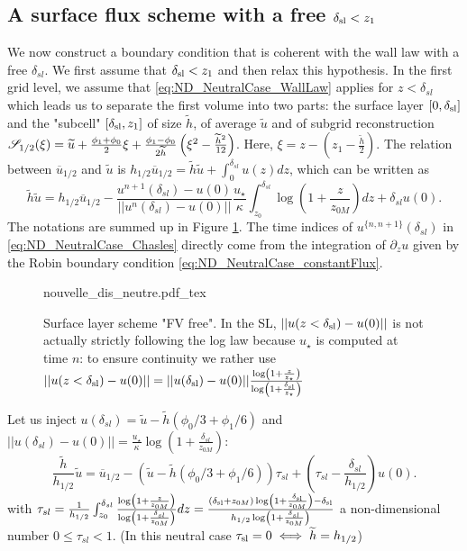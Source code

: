 \subsection{A surface flux scheme with a free $\delta_{\rm sl}<z_1$}
\label{sec:ND_NeutralCase_newSFscheme}
We now construct a boundary condition that is coherent
with the wall law with a free $\delta_{sl}$. We first assume
that $\delta_{\rm sl} < z_1$ and then relax this hypothesis.
In the first grid level, we assume that
\eqref{eq:ND_NeutralCase_WallLaw} applies for $z<\delta_{sl}$
which leads us to separate the 
first volume into two parts: the surface layer $[0,\delta_{\rm sl}]$ and the "subcell" $[\delta_{\rm sl}, z_1]$ of size $\widetilde{h}$, of average $\widetilde{u}$
and of subgrid reconstruction
${\cal S}_{1/2}(\xi) = \widetilde{u} + \frac{\phi_{1} + \phi_{0}}{2} \xi
+ \frac{\phi_{1} - \phi_{0}}{2\widetilde{h}}\left(\xi^2 - \frac{\widetilde{h}^2}{12}\right)
$.
Here, $\xi = z - (z_1 - \frac{\widetilde{h}}{2})$.
The relation between $\overline{u}_{1/2}$ and $\widetilde{u}$ is 
$ h_{1/2}\overline{u}_{1/2} = \widetilde{h}\widetilde{u}
+ \int_0^{\delta_{sl}}u(z)dz$, which can be written as
\begin{equation}
\label{eq:ND_NeutralCase_Chasles}
	\widetilde{h}\widetilde{u} = h_{1/2}\overline{u}_{1/2} - \frac{u^{n+1}(\delta_{sl})-u(0)}{||u^n(\delta_{sl})-u(0)||}\frac{{u_\star}}{\kappa}\int_{z_0}^{\delta_{sl}} \log(1+\frac{z}{z_{0M}}) dz
	+ \delta_{sl} u(0) .
\end{equation}
The notations are summed up in Figure
\ref{fig:ND_NeutralCase_nouvelle_dis_neutre}.
The time indices of $u^{\{n, n+1\}}(\delta_{sl})$
in \eqref{eq:ND_NeutralCase_Chasles} directly come from the integration 
of $\partial_z u$ given by the Robin boundary
condition \eqref{eq:ND_NeutralCase_constantFlux}.
\begin{figure}
	{nouvelle_dis_neutre.pdf_tex}
	\caption{ Surface layer scheme "FV free".
	In the SL, $||u(z<\delta_{\rm sl})-u(0)||$ is not
	actually strictly following the log law because
	$u_\star$ is computed at time $n$: to ensure continuity
	we rather use
	$||u(z<\delta_{\rm sl})-u(0)|| = 
	||u(\delta_{\rm sl})-u(0)|| \frac{\log(
	1+\frac{z}{z_\star})}{\log(1+\frac{\delta_{\rm sl}}{z_\star})}$
	}
	\label{fig:ND_NeutralCase_nouvelle_dis_neutre}
\end{figure}
\par
Let us inject $u(\delta_{sl}) = \widetilde{u} - \widetilde{h}(\phi_0/3 + \phi_1/6)$ and $||u(\delta_{sl})-u(0)|| = \frac{{u_\star}}{\kappa}\log(1+\frac{\delta_{sl}}{z_{0M}})$:
\begin{equation}
	\frac{\widetilde{h}}{h_{1/2}}\widetilde{u} = \overline{u}_{1/2} - \left(\widetilde{u} - \widetilde{h}(\phi_0/3 + \phi_1/6)
	\right)\tau_{sl} +
	(\tau_{sl} - \frac{\delta_{sl}}{h_{1/2}})u(0).
\end{equation}
with $\tau_{sl} = \frac{1}{{h_{1/2}}}\int_{z_0}^{\delta_{sl}} \frac{\log(1+\frac{z}{z_{0M}})}{\log(1+\frac{\delta_{sl}}{z_{0M}})} dz =
\frac{(\delta_{\rm sl} + z_{0M})\log(1+\frac{\delta_{\rm sl}}{z_{0M}}) - \delta_{\rm sl}}{h_{1/2}\log(1+\frac{\delta_{sl}}{z_{0M}})}$ a non-dimensional number $0 \leq\tau_{sl} < 1$. (In this neutral case $\tau_{\rm sl} = 0 \iff \widetilde{h}=h_{1/2}$)

